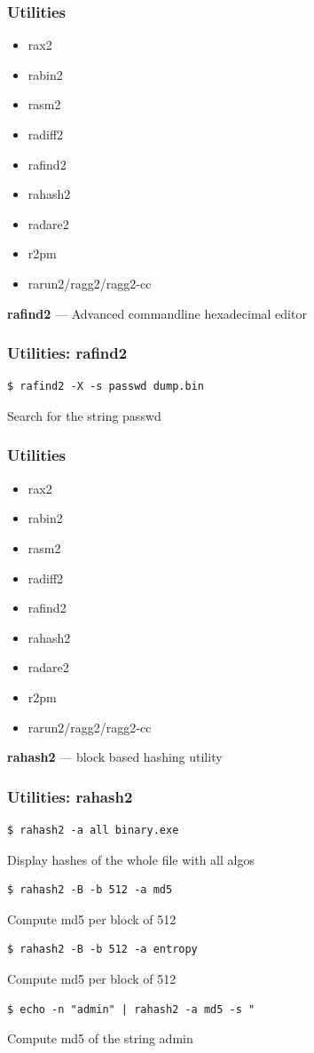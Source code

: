 \documentclass[10pt,pdf,utf8,english,compress,hyperref={unicode}]{beamer}
\begin{document}
\begin{frame}[fragile]
  \frametitle{Utilities}
     \begin{itemize}
        \item rax2
        \item rabin2
        \item rasm2
        \item radiff2
        \item \alert{rafind2}
        \item rahash2
        \item radare2
				\item r2pm
        \item rarun2/ragg2/ragg2-cc
      \end{itemize}
\end{frame}

\begin{frame}[fragile]
  \center\textbf{rafind2} — Advanced commandline hexadecimal editor
  \noindent\makebox[\linewidth]{\rule{\paperwidth}{0.4pt}}
  \frametitle{Utilities: rafind2}
  \begin{verbatim}$ rafind2 -X -s passwd dump.bin\end{verbatim}
  \alert{Search for the string passwd}

\end{frame}

\begin{frame}[fragile]
  \frametitle{Utilities}
     \begin{itemize}
        \item rax2
        \item rabin2
        \item rasm2
        \item radiff2
        \item rafind2
        \item \alert{rahash2}
        \item radare2
				\item r2pm
        \item rarun2/ragg2/ragg2-cc
      \end{itemize}
\end{frame}

\begin{frame}[fragile]
  \center\textbf{rahash2} — block based hashing utility
  \noindent\makebox[\linewidth]{\rule{\paperwidth}{0.4pt}}
  \frametitle{Utilities: rahash2}
  \begin{verbatim}$ rahash2 -a all binary.exe\end{verbatim}
  \alert{Display hashes of the whole file with all algos}
  \begin{verbatim}$ rahash2 -B -b 512 -a md5\end{verbatim}
  \alert{Compute md5 per block of 512}
  \begin{verbatim}$ rahash2 -B -b 512 -a entropy\end{verbatim}
  \alert{Compute md5 per block of 512}
  \begin{verbatim}$ echo -n "admin" | rahash2 -a md5 -s "\end{verbatim}
  \alert{Compute md5 of the string admin}

\end{frame}
\end{document}
